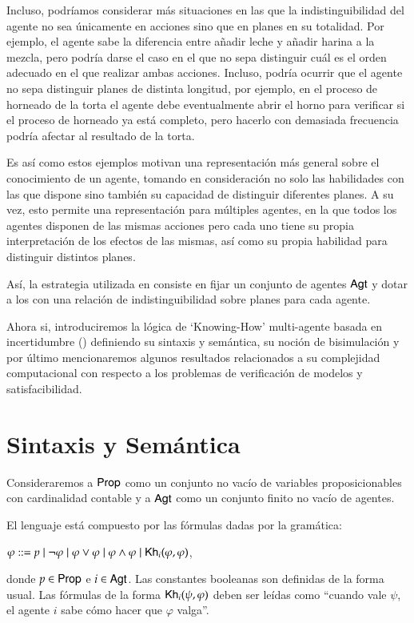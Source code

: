 Incluso, podríamos considerar más situaciones en las que la indistinguibilidad del agente no sea únicamente en acciones sino que en planes en su totalidad. Por ejemplo, 
el agente sabe la diferencia entre añadir leche y añadir harina a la mezcla, pero podría darse el caso en el que no sepa distinguir cuál es el orden adecuado en el que 
realizar ambas acciones. Incluso, podría ocurrir que el agente no sepa distinguir planes de distinta longitud, por ejemplo, en el proceso de horneado de la torta el agente 
debe eventualmente abrir el horno para verificar si el proceso de horneado ya está completo, pero hacerlo con demasiada frecuencia podría afectar al resultado de la torta.

Es así como estos ejemplos motivan una representación más general sobre el conocimiento de un agente, tomando en consideración no solo las habilidades con las que dispone sino 
también su capacidad de distinguir diferentes planes. A su vez, esto permite una representación para múltiples agentes, en la que todos los agentes disponen de las mismas acciones 
pero cada uno tiene su propia interpretación de los efectos de las mismas, así como su propia habilidad para distinguir distintos planes.

Así, la estrategia utilizada en \cite{ArecesFSV25,SaraviaPHD} consiste en fijar un conjunto de agentes ${\rm \sf Agt}$ y dotar a los \lts con una 
relación de indistinguibilidad sobre planes para cada agente.

Ahora si, introduciremos la lógica de `Knowing-How' multi-agente basada en incertidumbre (\KHilogic) definiendo su sintaxis y semántica, su noción de bisimulación y por último mencionaremos 
algunos resultados relacionados a su complejidad computacional con respecto a los problemas de verificación de modelos y satisfacibilidad.

\section{Sintaxis y Semántica}
Consideraremos a ${\rm \sf Prop}$ como un conjunto no vacío de variables proposicionables con cardinalidad contable 
y a ${\rm \sf Agt}$ como un conjunto finito no vacío de agentes.

\begin{definicion}
    El lenguaje \KHilogic está compuesto por las fórmulas dadas por la gramática:
    \begin{center}
        $\varphi ::= p \mid \neg \varphi \mid \varphi \vee \varphi \mid \varphi \wedge \varphi \mid \mathsf{Kh}_i(\varphi,\varphi)$,
    \end{center}
    donde $p \in {\rm \sf Prop}$ e $i \in {\rm \sf Agt}$. Las constantes booleanas son definidas de la forma usual. Las fórmulas de la forma 
    $\mathsf{Kh}_i(\psi, \varphi)$ deben ser leídas como ``cuando vale $\psi$, el agente $i$ sabe cómo hacer que $\varphi$ valga''.
\end{definicion}

